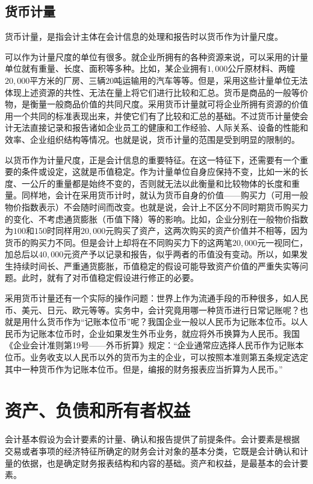 		\subsection{货币计量}
		
		货币计量，是指会计主体在会计信息的处理和报告时以货币作为计量尺度。
		
		可以作为计量尺度的单位有很多。就企业所拥有的各种资源来说，可以采用的计量单位就有重量、长度、面积等多种。比如，某企业拥有$1,000$公斤原材料、两幢$20,000$平方米的厂房、三辆$20$吨运输用的汽车等等。但是，采用这些计量单位无法体现上述资源的共性、无法在量上将它们进行比较和汇总。货币是商品的一般等价物，是衡量一般商品价值的共同尺度。采用货币计量就可将企业所拥有资源的价值用一个共同的标准表现出来，并使它们有了比较和汇总的基础。不过货币计量使会计无法直接记录和报告诸如企业员工的健康和工作经验、人际关系、设备的性能和效率、企业组织结构等情况。也就是说，货币计量的范围是受到明显的限制的。
		
		以货币作为计量尺度，正是会计信息的重要特征。在这一特征下，还需要有一个重要的条件或设定，这就是币值稳定。作为计量单位自身应保持不变，比如一米的长度、一公斤的重量都是始终不变的，否则就无法以此衡量和比较物体的长度和重量。同样地，会计在采用货币计时，就认为货币自身的价值——购买力（可用一般物价指数表示）不会随时间而改变。也就是说，会计上不区分不同时期货币购买力的变化、不考虑通货膨胀（币值下降）等的影响。比如，企业分别在一般物价指数为$100$和$150$时同样用$20,000$元购买了资产，这两次购买的资产价值并不相等，因为货币的购买力不同。但是会计上却将在不同购买力下的这两笔$20,000$元一视同仁，加总后以$40,000$元资产予以记录和报告，似乎两者的币值没有变动。所以，如果发生持续时间长、严重通货膨胀，币值稳定的假设可能导致资产价值的严重失实等问题。此时，就有了对币值稳定假设进行修正的必要。
		
		采用货币计量还有一个实际的操作问题：世界上作为流通手段的币种很多，如人民币、美元、日元、欧元等等。实务中，会计究竟用哪一种货币进行日常记账呢？也就是用什么货币作为“记账本位币”呢？我国企业一般以人民币为记账本位币。以人民币为记账本位币时，企业如果发生外币业务，就应将外币换算为人民币。我国《企业会计准则第19号——外币折算》规定：“企业通常应选择人民币作为记账本位币。业务收支以人民币以外的货币为主的企业，可以按照本准则第五条规定选定其中一种货币作为记账本位币。但是，编报的财务报表应当折算为人民币。”

	\section{资产、负债和所有者权益}

	会计基本假设为会计要素的计量、确认和报告提供了前提条件。会计要素是根据 交易或者亊项的经济特征所确定的财务会计对象的基本分类，它既是会计确认和计量的依据，也是确定财务报表结构和内容的基础。资产和权益，是最基本的会计要素。

